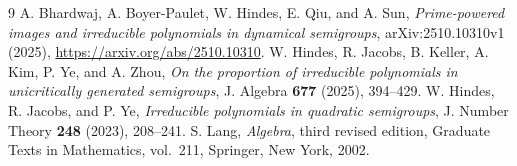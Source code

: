 \documentclass[11pt]{article}
\theoremstyle{remark}
\begin{document}
\begin{thebibliography}{9}
A. Bhardwaj, A. Boyer-Paulet, W. Hindes, E. Qiu, and A. Sun,
\emph{Prime-powered images and irreducible polynomials in dynamical semigroups},
arXiv:2510.10310v1 (2025), \url{https://arxiv.org/abs/2510.10310}.
W. Hindes, R. Jacobs, B. Keller, A. Kim, P. Ye, and A. Zhou,
\emph{On the proportion of irreducible polynomials in unicritically generated semigroups},
J. Algebra \textbf{677} (2025), 394--429.
W. Hindes, R. Jacobs, and P. Ye,
\emph{Irreducible polynomials in quadratic semigroups},
J. Number Theory \textbf{248} (2023), 208--241.
S. Lang, \emph{Algebra}, third revised edition,
Graduate Texts in Mathematics, vol.~211, Springer, New York, 2002.
\end{thebibliography}
\end{document}
